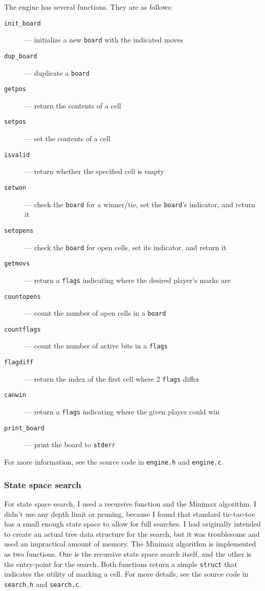 \documentclass{article}
\begin{document}
The engine has several functions. They are as follows:
\begin{description}
\item[\texttt{init\_board}] --- initialize a new \texttt{board} with the indicated moves
\item[\texttt{dup\_board}] --- duplicate a \texttt{board}
\item[\texttt{getpos}] --- return the contents of a cell
\item[\texttt{setpos}] --- set the contents of a cell
\item[\texttt{isvalid}] --- return whether the specified cell is empty
\item[\texttt{setwon}] --- check the \texttt{board} for a winner/tie, set the \texttt{board}'s indicator, and return it
\item[\texttt{setopens}] --- check the \texttt{board} for open cells, set its indicator, and return it
\item[\texttt{getmovs}] --- return a \texttt{flags} indicating where the desired player's marks are
\item[\texttt{countopens}] --- count the number of open cells in a \texttt{board}
\item[\texttt{countflags}] --- count the number of active bits in a \texttt{flags}
\item[\texttt{flagdiff}] --- return the index of the first cell where 2 \texttt{flags} differ
\item[\texttt{canwin}] --- return a \texttt{flags} indicating where the given player could win
\item[\texttt{print\_board}] --- print the board to \texttt{stderr}
\end{description}

For more information, see the source code in \texttt{engine.h} and \texttt{engine.c}.

\subsubsection{State space search}

For state space search, I used a recursive function and the Minimax algorithm. I didn't use any depth limit or pruning, because I found that standard tic-tac-toe has a small enough state space to allow for full searches.
I had originally intended to create an actual tree data structure for the search, but it was troublesome and used an impractical amount of memory. The Minimax algorithm is implemented as two functions.
One is the recursive state space search itself, and the other is the entry-point for the search. Both functions return a simple \texttt{struct} that indicates the utility of marking a cell. For more details, see the source
code in \texttt{search.h} and \texttt{search.c}.
\end{document}

